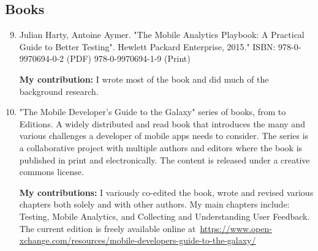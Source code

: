 \subsection{Books}
\begin{enumerate}
    \setcounter{enumi}{8}
    \item Julian Harty, Antoine Aymer. "The Mobile Analytics Playbook: A Practical Guide to Better Testing". Hewlett Packard Enterprise, 2015."
    ISBN: 978-0-9970694-0-2 (PDF) 978-0-9970694-1-9 (Print)
    
    \textbf{My contribution:} I wrote most of the book and did much of the background research.
    
    \item "The Mobile Developer's Guide to the Galaxy" series of books, from  to  Editions. A widely distributed and read book that introduces the many and various challenges a developer of mobile apps needs to consider. The series is a collaborative project with multiple authors and editors where the book is published in print and electronically. The content is released under a creative commons license. 
    
    \textbf{My contributions:} I variously co-edited the book, wrote and revised various chapters both solely and with other authors. My main chapters include: Testing, Mobile Analytics, and Collecting and Understanding User Feedback. The current edition is freely available online at~\url{https://www.open-xchange.com/resources/mobile-developers-guide-to-the-galaxy/}
\end{enumerate}
\clearpage